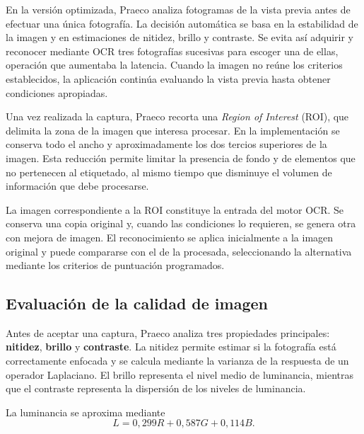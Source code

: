 En la versión optimizada, Praeco analiza fotogramas de la vista previa antes de efectuar una única fotografía. La decisión automática se basa en la estabilidad de la imagen y en estimaciones de nitidez, brillo y contraste. Se evita así adquirir y reconocer mediante OCR tres fotografías sucesivas para escoger una de ellas, operación que aumentaba la latencia. Cuando la imagen no reúne los criterios establecidos, la aplicación continúa evaluando la vista previa hasta obtener condiciones apropiadas.

Una vez realizada la captura, Praeco recorta una \textit{Region of Interest} (ROI), que delimita la zona de la imagen que interesa procesar. En la implementación se conserva todo el ancho y aproximadamente los dos tercios superiores de la imagen. Esta reducción permite limitar la presencia de fondo y de elementos que no pertenecen al etiquetado, al mismo tiempo que disminuye el volumen de información que debe procesarse.

La imagen correspondiente a la ROI constituye la entrada del motor OCR. Se conserva una copia original y, cuando las condiciones lo requieren, se genera otra con mejora de imagen. El reconocimiento se aplica inicialmente a la imagen original y puede compararse con el de la procesada, seleccionando la alternativa mediante los criterios de puntuación programados.

\subsection{Evaluación de la calidad de imagen}

Antes de aceptar una captura, Praeco analiza tres propiedades principales: \textbf{nitidez}, \textbf{brillo} y \textbf{contraste}. La nitidez permite estimar si la fotografía está correctamente enfocada y se calcula mediante la varianza de la respuesta de un operador Laplaciano. El brillo representa el nivel medio de luminancia, mientras que el contraste representa la dispersión de los niveles de luminancia.

La luminancia se aproxima mediante
\begin{equation}
	L=0{,}299R+0{,}587G+0{,}114B.
\end{equation}

